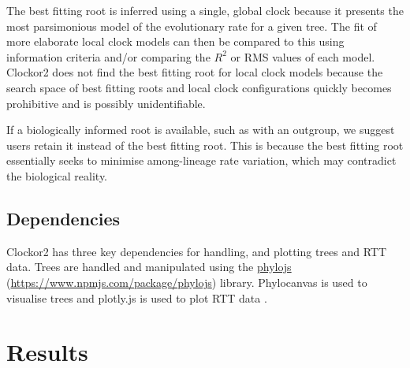\documentclass{article}
\begin{document}
The best fitting root is inferred using a single, global clock because it presents the most parsimonious model of the evolutionary rate for a given tree. The fit of more elaborate local clock models can then be compared to this using information criteria and/or comparing the $R^2$ or RMS
values of each model. Clockor2 does not find the best fitting root for local clock models because the search space of best fitting roots and local clock configurations quickly becomes prohibitive and is possibly unidentifiable.

{If a biologically informed root is available, such as with an outgroup, we suggest users retain it instead of the best fitting root. This is because the best fitting root essentially seeks to minimise among-lineage rate variation, which may contradict the biological reality.}

\subsection*{Dependencies}
Clockor2 has three key dependencies for handling, and plotting trees and RTT data. Trees are handled and manipulated using the \href{https://www.npmjs.com/package/phylojs}{phylojs} (\url{https://www.npmjs.com/package/phylojs}) library. Phylocanvas is used to visualise trees and plotly.js is used to plot RTT data \citep{abudahab_phylocanvasgl_2021,plotly}.

\section*{Results}
\end{document}

